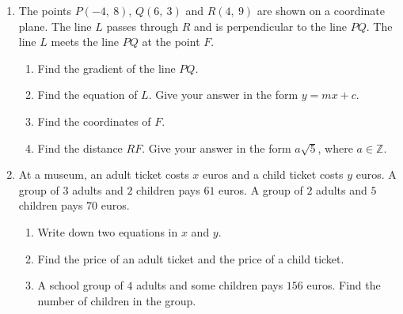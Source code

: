 \documentclass[12pt, twoside]{article}
\begin{document}
\begin{enumerate}[itemsep=0.15cm]

\newpage

\item[3.]
The points $P(-4,\ 8)$, $Q(6,\ 3)$ and $R(4,\ 9)$ are shown on a
coordinate plane. The line $L$ passes through $R$ and is perpendicular
to the line $PQ$. The line $L$ meets the line $PQ$ at the point $F$.

\begin{enumerate}[itemsep=0.1cm]
  \item Find the gradient of the line $PQ$.
  \item Find the equation of $L$. Give your answer in the form
  $y = mx + c$.
  \item Find the coordinates of $F$.
  \item Find the distance $RF$. Give your answer in the form $a\sqrt{5}$,
  where $a \in \mathbb{Z}$.
\end{enumerate}


\newpage

\item[4.]
At a museum, an adult ticket costs $x$ euros and a child ticket costs
$y$ euros. A group of $3$ adults and $2$ children pays $61$ euros. A group
of $2$ adults and $5$ children pays $70$ euros.

\begin{enumerate}[itemsep=0.1cm]
  \item Write down two equations in $x$ and $y$.
  \item Find the price of an adult ticket and the price of a child ticket.
  \item A school group of $4$ adults and some children pays $156$ euros.
  Find the number of children in the group.
\end{enumerate}


\end{enumerate}
\end{document}
